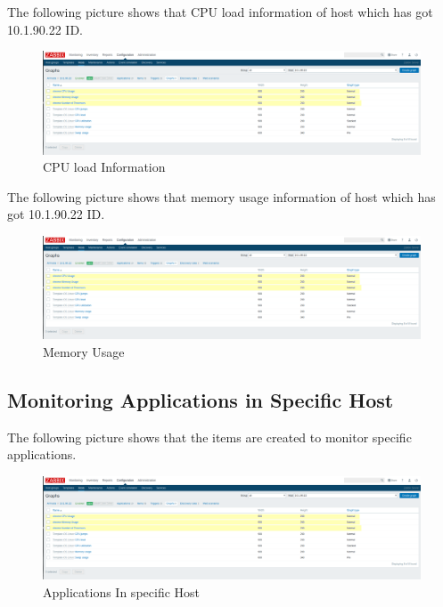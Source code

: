 \documentclass{article}
\begin{document}
The following picture shows that CPU load information of host which has got 10.1.90.22 ID.

\begin{figure}[h]
\centering
\includegraphics[scale=0.3]{graphs_eklendi1}
\caption{CPU load Information}
\end{figure}


The following picture shows that memory usage information of host which has got 10.1.90.22 ID.

\begin{figure}[h]
\centering
\includegraphics[scale=0.3]{graphs_eklendi1}
\caption{Memory Usage}
\end{figure}



\subsection{ Monitoring Applications in Specific Host}

The following picture shows that the items are created to monitor specific applications. 

\begin{figure}[h]
\centering
\includegraphics[scale=0.3]{graphs_eklendi1}
\caption{Applications In specific Host}
\end{figure}
\end{document}
